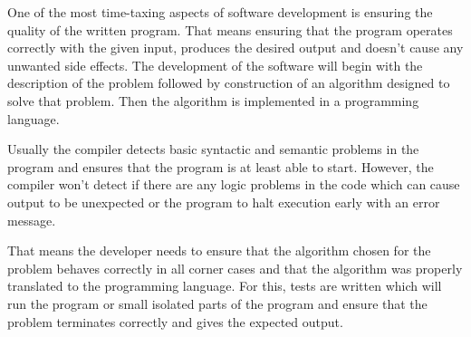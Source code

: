 \documentclass[..thesis.tex]{subfiles}
\begin{document}
One of the most time-taxing aspects of software development is ensuring the quality of the written program. 
That means ensuring that the program operates correctly with the given input, produces the desired output and doesn't cause any unwanted side effects.
The development of the software will begin with the description of the problem followed by construction of an algorithm designed to solve that problem. 
Then the algorithm is implemented in a programming language.

Usually the compiler detects basic syntactic and semantic problems in the program and ensures that the program is at least able to start. 
However, the compiler won't detect if there are any logic problems in the code which can cause output to be unexpected or the program to halt execution early with an error message.

That means the developer needs to ensure that the algorithm chosen for the problem behaves correctly in all corner cases and that the algorithm was properly translated to the programming language. 
For this, tests are written which will run the program or small isolated parts of the program and ensure that the problem terminates correctly and gives the expected output.
\end{document}
